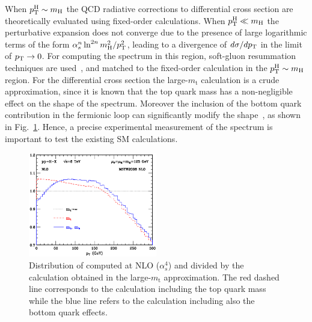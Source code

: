 When $p_\mathrm{T}^\mathrm{H} \sim m_\mathrm{H}$ the QCD radiative corrections to \pth differential cross section are theoretically evaluated using fixed-order calculations. When $p_\mathrm{T}^\mathrm{H} \ll m_\mathrm{H}$ the perturbative expansion does not converge due to the presence of large logarithmic terms of the form $\alpha_s^n \ln^{2n}m_\mathrm{H}^2/p_\mathrm{T}^2$, leading to a divergence of $d\sigma/dp_\mathrm{T}$ in the limit of $p_\mathrm{T}\to0$. For computing the \pth spectrum in this region, soft-gluon resummation techniques are used~\cite{Bozzi:2005wk,deFlorian:2012mx}, and matched to the fixed-order calculation in the $p_\mathrm{T}^\mathrm{H} \sim m_\mathrm{H}$ region.
For the \pth differential cross section the large-$m_\mathrm{t}$ calculation is a crude approximation, since it is known that the top quark mass has a non-negligible effect on the shape of the spectrum. Moreover the inclusion of the bottom quark contribution in the fermionic loop can significantly modify the \pth shape~\cite{Grazzini:2013mca}, as shown in Fig.~\ref{fig:pth_quarkmass}. Hence, a precise experimental measurement of the \pth spectrum is important to test the existing SM calculations. 

\begin{figure}[!h]
\centering
\includegraphics[width=0.5\textwidth]{images/pth_quarkmass.png}
\caption{Distribution of \pth computed at NLO ($\alpha_s^4$) and divided by the calculation obtained in the large-$m_\mathrm{t}$ approximation. The red dashed line corresponds to the calculation including the top quark mass while the blue line refers to the calculation including also the bottom quark effects.}\label{fig:pth_quarkmass}
\end{figure}

